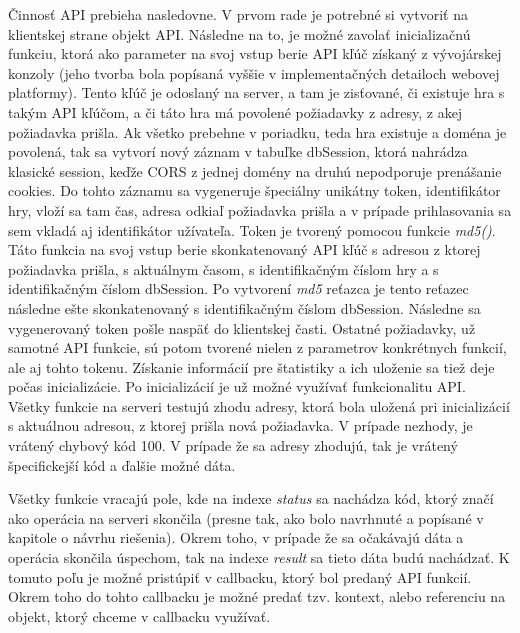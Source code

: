 Činnosť API prebieha nasledovne. V prvom rade je potrebné si vytvoriť na klientskej strane objekt API. Následne na to, je možné zavolať inicializačnú funkciu, ktorá ako parameter na svoj vstup berie API kľúč získaný z vývojárskej konzoly (jeho tvorba bola popísaná vyššie v implementačných detailoch webovej platformy). Tento kľúč je odoslaný na server, a tam je zisťované, či existuje hra s takým API kľúčom, a či táto hra má povolené požiadavky z adresy, z akej požiadavka prišla. Ak všetko prebehne v poriadku, teda hra existuje a doména je povolená, tak sa vytvorí nový záznam v tabuľke dbSession, ktorá nahrádza klasické session, keďže CORS z jednej domény na druhú nepodporuje prenášanie cookies. Do tohto záznamu sa vygeneruje špeciálny unikátny token, identifikátor hry, vloží sa tam čas, adresa odkiaľ požiadavka prišla a v prípade prihlasovania sa sem vkladá aj identifikátor užívateľa. Token je tvorený pomocou funkcie \textit{md5()}. Táto funkcia na svoj vstup berie skonkatenovaný API kľúč s adresou z ktorej požiadavka prišla, s aktuálnym časom, s identifikačným číslom hry a s identifikačným číslom dbSession. Po vytvorení \textit{md5} reťazca je tento reťazec následne ešte skonkatenovaný s identifikačným číslom dbSession. Následne sa vygenerovaný token pošle naspäť do klientskej časti. Ostatné požiadavky, už samotné API funkcie, sú potom tvorené nielen z parametrov konkrétnych funkcií, ale aj tohto tokenu. Získanie informácií pre štatistiky  a ich uloženie sa tiež deje počas inicializácie. Po inicializácií je už možné využívať funkcionalitu API. Všetky funkcie na serveri testujú zhodu adresy, ktorá bola uložená pri inicializácií s aktuálnou adresou, z ktorej prišla nová požiadavka. V prípade nezhody, je vrátený chybový kód 100. V prípade že sa adresy zhodujú, tak je vrátený špecifickejší kód a ďalšie možné dáta.

Všetky funkcie vracajú pole, kde na indexe \textit{status} sa nachádza kód, ktorý značí ako operácia na serveri skončila (presne tak, ako bolo navrhnuté a popísané v kapitole o návrhu riešenia). Okrem toho, v prípade že sa očakávajú dáta a operácia skončila úspechom, tak na indexe \textit{result} sa tieto dáta budú nachádzať. K tomuto poľu je možné pristúpiť v callbacku, ktorý bol predaný API funkcií. Okrem toho do tohto callbacku je možné predať tzv. kontext, alebo referenciu na objekt, ktorý chceme v callbacku využívať. 

